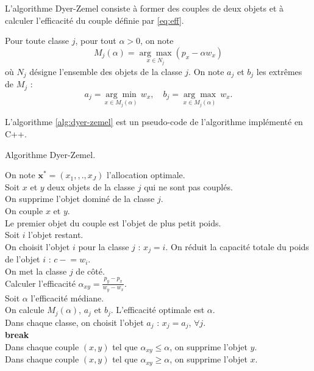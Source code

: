 \documentclass{article}
\newcommand{\minuseq}{\mathrel{-}=}
\begin{document}
L'algorithme Dyer-Zemel consiste à former des couples de deux objets et à calculer l'efficacité du couple définie par \eqref{eq:eff}.

Pour toute classe $j$, pour tout $\alpha>0$, on note
\[ M_j(\alpha) = \underset{x\in N_j}{\arg \max} ( p_x - \alpha w_x) \]
où $N_j$ désigne l'ensemble des objets de la classe $j$.
On note $a_j$ et $b_j$ les extrêmes de $M_j$ :
\[ a_j = \underset{x\in M_j(\alpha)}{\arg\min}\ w_x, \quad b_j = \underset{x\in M_j(\alpha)}{\arg\max}\ w_x. \]

L'algorithme \ref{alg:dyer-zemel} est un pseudo-code de l'algorithme implémenté en C++.

\begin{algorithm}[!ht]
\caption{Algorithme Dyer-Zemel.}
\label{alg:dyer-zemel}
\small
{}
{
	On note $\mathbf{x}^{*} = (x_1, ,., x_J)$ l'allocation optimale.\\
	{
		{
			Soit $x$ et $y$ deux objets de la classe $j$ qui ne sont pas couplés.\\
			{
				On supprime l'objet dominé de la classe $j$.\\
			}
			{
				On couple $x$ et $y$.\\
				Le premier objet du couple est l'objet de plus petit poids.\\
			}
		}
	}
	{
		{
			Soit $i$ l'objet restant.\\
			On choisit l'objet $i$ pour la classe $j$ : $x_j = i$.
			On réduit la capacité totale du poids de l'objet $i$ : $c \minuseq w_{i}$.\\
			On met la classe $j$ de côté.\\

		}
	}
	{
		Calculer l'efficacité $\alpha_{xy} = \frac{p_{y}-p_{x}}{w_{y}-w_{x}}$.\\
	}
	Soit $\alpha$ l'efficacité médiane.\\
	{
		On calcule $M_j(\alpha)$, $a_j$ et $b_j$.
	}
	{
		L'efficacité optimale est $\alpha$.\\
		Dans chaque classe, on choisit l'objet $a_j$ : $x_j = a_j$, $\forall j$.\\
		\textbf{break}\\
	}
	{
		{
			Dans chaque couple $(x, y)$ tel que $\alpha_{xy} \leq \alpha$, on supprime l'objet $y$.\\
		}
		{
			Dans chaque couple $(x, y)$ tel que $\alpha_{xy} \geq \alpha$, on supprime l'objet $x$.\\
		}
	}
}
\end{algorithm}
\end{document}

